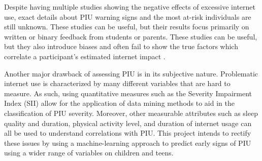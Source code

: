 \documentclass[11pt]{extarticle}
\begin{document}

Despite having multiple studies showing the negative effects of excessive internet use, exact details about PIU warning signs and the most at-risk individuals are still unknown.
These studies can be useful, but their results focus primarily on written or binary feedback from students or parents. 
These studies can be useful, but they also introduce biases and often fail to show the true factors which correlate a participant's estimated internet impact \cite{Restrepo2020-pb,Aboujaoude2010-mc}.

Another major drawback of assessing PIU is in its subjective nature. 
Problematic internet use is characterized by many different variables that are hard to measure. 
As such, using quantitative measures such as the Severity Impairment Index (SII) allow for the application of data mining methods to aid in the classification of PIU severity. 
Moreover, other measurable attributes such as sleep quality and duration, physical activity level, and duration of internet usage can all be used to understand correlations with PIU.
This project intends to rectify these issues by using a machine-learning approach to predict early signs of PIU using a wider range of variables on children and teens.

\end{document}
